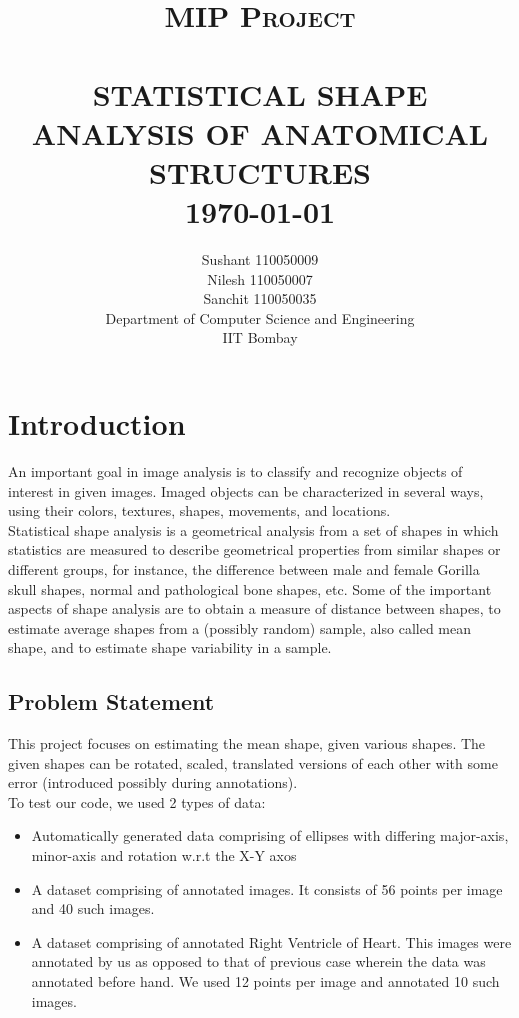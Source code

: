 \documentclass[paper=a4, fontsize=11pt,twoside]{scrartcl}	%
\title{	\normalsize \textsc{MIP Project} 	%
		 	\\[2.0cm]								%
			\HRule{0.5pt} \\						%
			\LARGE \textbf{\uppercase{Statistical Shape Analysis of Anatomical Structures}}	%
			\HRule{2pt} \\ [0.5cm]		%
			\normalsize \today			%
		}
\author{Sushant 110050009\\
        Nilesh 110050007\\
        Sanchit 110050035\\
		Department of Computer Science and Engineering\\
        IIT Bombay\\
}
\makeatletter
\def\printtitle{%
    {\centering \@title\par}}
\def\printauthor{%
    {\centering \large \@author}}
\makeatother
\begin{document}
\thispagestyle{empty}		%

\printtitle					%
  	\vfill
\printauthor				%
\newpage
\tableofcontents
\newpage
\setcounter{page}{1}		%
\section{Introduction}
An important goal in image analysis is to classify and recognize objects of interest in given images. Imaged objects can be characterized in several ways, using their colors, textures, shapes, movements, and locations.
\\

Statistical shape analysis is a geometrical analysis from a set of shapes in which statistics are measured to describe geometrical properties from similar shapes or different groups, for instance, the difference between male and female Gorilla skull shapes, normal and pathological bone shapes, etc. Some of the important aspects of shape analysis are to obtain a measure of distance between shapes, to estimate average shapes from a (possibly random) sample, also called mean shape, and to estimate shape variability in a sample.

\subsection{Problem Statement}
This project focuses on estimating the mean shape, given various shapes. The given shapes can be rotated, scaled, translated versions of each other with some error (introduced possibly during annotations).
\\
To test our code, we used 2 types of data: 
\begin{itemize}
\item Automatically generated data comprising of ellipses with differing major-axis, minor-axis and rotation w.r.t the X-Y axos
\item A dataset comprising of annotated 
images. It consists of 56 points per image and 40 such images.
\item A dataset comprising of annotated Right Ventricle of Heart. This images were annotated by us as opposed to that of previous case wherein the data was annotated before hand. We used 12 points per image and annotated 10 such images.
\end{itemize}
\end{document}
